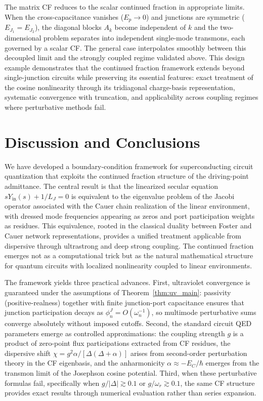 \documentclass[reprint, floatfix, superscriptaddress, amsmath, amssymb, longbibliography]{revtex4-2}
\begin{document}
The matrix CF reduces to the scalar continued fraction in appropriate limits. When the cross-capacitance vanishes ($E_p \to 0$) and junctions are symmetric ($E_{J_1} = E_{J_2}$), the diagonal blocks ${A}_k$ become independent of $k$ and the two-dimensional problem separates into independent single-mode transmons, each governed by a scalar CF. The general case interpolates smoothly between this decoupled limit and the strongly coupled regime validated above. This design example demonstrates that the continued fraction framework extends beyond single-junction circuits while preserving its essential features: exact treatment of the cosine nonlinearity through its tridiagonal charge-basis representation, systematic convergence with truncation, and applicability across coupling regimes where perturbative methods fail.

\section{Discussion and Conclusions}
\label{sec:conclusion}

We have developed a boundary-condition framework for superconducting circuit quantization that exploits the continued fraction structure of the driving-point admittance. The central result is that the linearized secular equation $sY_{\mathrm{in}}(s) + 1/L_J = 0$ is equivalent to the eigenvalue problem of the Jacobi operator associated with the Cauer chain realization of the linear environment, with dressed mode frequencies appearing as zeros and port participation weights as residues. This equivalence, rooted in the classical duality between Foster and Cauer network representations, provides a unified treatment applicable from dispersive through ultrastrong and deep strong coupling. The continued fraction emerges not as a computational trick but as the natural mathematical structure for quantum circuits with localized nonlinearity coupled to linear environments.

The framework yields three practical advances. First, ultraviolet convergence is guaranteed under the assumptions of Theorem~\ref{thm:uv_main}: passivity (positive-realness) together with finite junction-port capacitance ensures that junction participation decays as $\phi_n^J = O(\omega_n^{-1})$, so multimode perturbative sums converge absolutely without imposed cutoffs. Second, the standard circuit QED parameters emerge as controlled approximations: the coupling strength $g$ is a product of zero-point flux participations extracted from CF residues, the dispersive shift $\chi = g^2\alpha/[\Delta(\Delta+\alpha)]$ arises from second-order perturbation theory in the CF eigenbasis, and the anharmonicity $\alpha \approx -E_C/\hbar$ emerges from the transmon limit of the Josephson cosine potential. Third, when these perturbative formulas fail, specifically when $g/|\Delta| \gtrsim 0.1$ or $g/\omega_r \gtrsim 0.1$, the same CF structure provides exact results through numerical evaluation rather than series expansion. 
\end{document}

